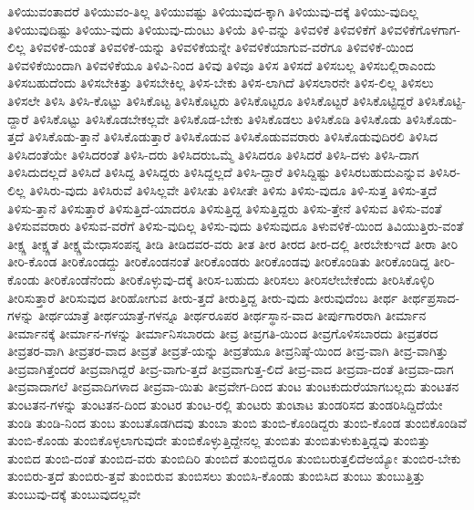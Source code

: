 {ತಿಳಿಯುವಂತಾದರೆ
ತಿಳಿಯುವಂ-ತಿಲ್ಲ
ತಿಳಿಯುವಷ್ಟು
ತಿಳಿಯುವುದ-ಕ್ಕಾಗಿ
ತಿಳಿಯುವು-ದಕ್ಕೆ
ತಿಳಿಯು-ವುದಿಲ್ಲ
ತಿಳಿಯುವುದಿಷ್ಟು
ತಿಳಿಯು-ವುದು
ತಿಳಿಯುವು-ದುಂಟು
ತಿಳಿಯೆ
ತಿಳಿ-ವನ್ನು
ತಿಳಿವಳಿಕೆ
ತಿಳಿವಳಿಕೆಗೆ
ತಿಳಿವಳಿಕೆಗೊಳಗಾಗ-ಲಿಲ್ಲ
ತಿಳಿವಳಿಕೆ-ಯಂತೆ
ತಿಳಿವಳಿಕೆ-ಯನ್ನು
ತಿಳಿವಳಿಕೆಯನ್ನೇ
ತಿಳಿವಳಿಕೆಯಾಗುವ-ವರೆಗೂ
ತಿಳಿವಳಿಕೆ-ಯಿಂದ
ತಿಳಿವಳಿಕೆಯಿಂದಾಗಿ
ತಿಳಿವಳಿಕೆಯೂ
ತಿಳಿವಿ-ನಿಂದ
ತಿಳಿವು
ತಿಳಿವೂ
ತಿಳಿಸ
ತಿಳಿಸದೆ
ತಿಳಿಸಬಲ್ಲ
ತಿಳಿಸಬಲ್ಲಿರಾಎಂದು
ತಿಳಿಸಬಹುದೆಂದು
ತಿಳಿಸಬೇಕಿತ್ತು
ತಿಳಿಸಬೇಕಿಲ್ಲ
ತಿಳಿಸ-ಬೇಕು
ತಿಳಿಸ-ಲಾಗಿದೆ
ತಿಳಿಸಲಾರನೇ
ತಿಳಿಸ-ಲಿಲ್ಲ
ತಿಳಿಸಲು
ತಿಳಿಸಲೇ
ತಿಳಿಸಿ
ತಿಳಿಸಿ-ಕೊಟ್ಟು
ತಿಳಿಸಿಕೊಟ್ಟ
ತಿಳಿಸಿಕೊಟ್ಟರು
ತಿಳಿಸಿಕೊಟ್ಟರೂ
ತಿಳಿಸಿಕೊಟ್ಟರೆ
ತಿಳಿಸಿಕೊಟ್ಟಿದ್ದರೆ
ತಿಳಿಸಿಕೊಟ್ಟಿ-ದ್ದಾರೆ
ತಿಳಿಸಿಕೊಟ್ಟು
ತಿಳಿಸಿಕೊಡಬೇಕಲ್ಲವೇ
ತಿಳಿಸಿಕೊಡ-ಬೇಕು
ತಿಳಿಸಿಕೊಡಲು
ತಿಳಿಸಿಕೊಡಿ
ತಿಳಿಸಿಕೊಡು
ತಿಳಿಸಿಕೊಡು-ತ್ತದೆ
ತಿಳಿಸಿಕೊಡು-ತ್ತಾನೆ
ತಿಳಿಸಿಕೊಡುತ್ತಾರೆ
ತಿಳಿಸಿಕೊಡುವ
ತಿಳಿಸಿಕೊಡುವವರಾರು
ತಿಳಿಸಿಕೊಡುವುದಿರಲಿ
ತಿಳಿಸಿದ
ತಿಳಿಸಿದಂತೆಯೇ
ತಿಳಿಸಿದರಂತೆ
ತಿಳಿಸಿ-ದರು
ತಿಳಿಸಿದರುಒಮ್ಮೆ
ತಿಳಿಸಿದರೂ
ತಿಳಿಸಿದರೆ
ತಿಳಿಸಿ-ದಳು
ತಿಳಿಸಿ-ದಾಗ
ತಿಳಿಸಿದುದಲ್ಲದೆ
ತಿಳಿಸಿದೆ
ತಿಳಿಸಿದ್ದ
ತಿಳಿಸಿದ್ದರು
ತಿಳಿಸಿದ್ದಲ್ಲದೆ
ತಿಳಿಸಿ-ದ್ದಾರೆ
ತಿಳಿಸಿದ್ದಿಷ್ಟು
ತಿಳಿಸಿರಬಹುದುಎನ್ನುವ
ತಿಳಿಸಿರ-ಲಿಲ್ಲ
ತಿಳಿಸಿರು-ವುದು
ತಿಳಿಸಿರುವೆ
ತಿಳಿಸಿಲ್ಲವೇ
ತಿಳಿಸೀತು
ತಿಳಿಸೀತೇ
ತಿಳಿಸು
ತಿಳಿಸು-ವುದೂ
ತಿಳಿ-ಸುತ್ತ
ತಿಳಿಸು-ತ್ತದೆ
ತಿಳಿಸು-ತ್ತಾನೆ
ತಿಳಿಸುತ್ತಾರೆ
ತಿಳಿಸುತ್ತಿದೆ-ಯಾದರೂ
ತಿಳಿಸುತ್ತಿದ್ದ
ತಿಳಿಸುತ್ತಿದ್ದರು
ತಿಳಿಸು-ತ್ತೇನೆ
ತಿಳಿಸುವ
ತಿಳಿಸು-ವಂತೆ
ತಿಳಿಸುವವರಾರು
ತಿಳಿಸುವ-ವರೆಗೆ
ತಿಳಿಸು-ವುದಿಲ್ಲ
ತಿಳಿಸು-ವುದು
ತಿಳಿಸುವುದೂ
ತಿಳುವಳಿಕೆ-ಯಿಂದ
ತಿವಿಯುತ್ತಿರು-ವಂತೆ
ತೀಕ್ಷ್ಣ
ತೀಕ್ಷ್ಣತೆ
ತೀಕ್ಷ್ಣಮೇಧಾಸಂಪನ್ನ
ತೀಡಿ
ತೀಡಿದವರ-ವರು
ತೀತ
ತೀರ
ತೀರದ
ತೀರ-ದಲ್ಲಿ
ತೀರಬೇಕುಇದೆ
ತೀರಾ
ತೀರಿ
ತೀರಿ-ಕೊಂಡ
ತೀರಿಕೊಂಡದ್ದು
ತೀರಿಕೊಂಡನಂತೆ
ತೀರಿಕೊಂಡರು
ತೀರಿಕೊಂಡವು
ತೀರಿಕೊಂಡಿತು
ತೀರಿಕೊಂಡಿದ್ದ
ತೀರಿ-ಕೊಂಡು
ತೀರಿಕೊಂಡೆನೆಂದು
ತೀರಿಕೊಳ್ಳುವು-ದಕ್ಕೆ
ತೀರಿಸ-ಬಹುದು
ತೀರಿಸಲು
ತೀರಿಸಲೇಬೇಕೆಂದು
ತೀರಿಸಿಕೊಳ್ಳಿರಿ
ತೀರಿಸುತ್ತಾರೆ
ತೀರಿಸುವುದ
ತೀರಿಹೋಗುವ
ತೀರು-ತ್ತದೆ
ತೀರುತ್ತಿದ್ದ
ತೀರು-ವುದು
ತೀರುವುದೆಂಬ
ತೀರ್ಥ
ತೀರ್ಥಪ್ರಸಾದ-ಗಳನ್ನು
ತೀರ್ಥಯಾತ್ರೆ
ತೀರ್ಥಯಾತ್ರೆ-ಗಳನ್ನೂ
ತೀರ್ಥರೂಪರ
ತೀರ್ಥಸ್ಥಾನ-ವಾದ
ತೀರ್ಪುಗಾರರಾಗಿ
ತೀರ್ಮಾನ
ತೀರ್ಮಾನಕ್ಕೆ
ತೀರ್ಮಾನ-ಗಳನ್ನು
ತೀರ್ಮಾನಿಸಬಾರದು
ತೀವ್ರ
ತೀವ್ರಗತಿ-ಯಿಂದ
ತೀವ್ರಗೊಳಿಸಬಾರದು
ತೀವ್ರತರದ
ತೀವ್ರತರ-ವಾಗಿ
ತೀವ್ರತರ-ವಾದ
ತೀವ್ರತೆ
ತೀವ್ರತೆ-ಯನ್ನು
ತೀವ್ರತೆಯೂ
ತೀವ್ರನಿಷ್ಠೆ-ಯಿಂದ
ತೀವ್ರ-ವಾಗಿ
ತೀವ್ರ-ವಾಗಿತ್ತು
ತೀವ್ರವಾಗಿತ್ತೆಂದರೆ
ತೀವ್ರವಾಗಿದ್ದರೆ
ತೀವ್ರ-ವಾಗು-ತ್ತದೆ
ತೀವ್ರವಾಗುತ್ತ-ಲಿದೆ
ತೀವ್ರ-ವಾದ
ತೀವ್ರವಾ-ದಂತೆ
ತೀವ್ರವಾ-ದಾಗ
ತೀವ್ರವಾದಾಗಲೆ
ತೀವ್ರವಾದಿಗಳಾದ
ತೀವ್ರವಾ-ಯಿತು
ತೀವ್ರವೇಗ-ದಿಂದ
ತುಂಟ
ತುಂಟಕುದುರೆಯಾಗಬಲ್ಲದು
ತುಂಟತನ
ತುಂಟತನ-ಗಳನ್ನು
ತುಂಟತನ-ದಿಂದ
ತುಂಟರ
ತುಂಟ-ರಲ್ಲಿ
ತುಂಟರು
ತುಂಟಾಟ
ತುಂಡರಿಸದ
ತುಂಡರಿಸಿದ್ದಿದೆಯೇ
ತುಂಡಿ
ತುಂಡಿ-ನಿಂದ
ತುಂಬ
ತುಂಬತೊಡಗಿದವು
ತುಂಬಾ
ತುಂಬಿ
ತುಂಬಿ-ಕೊಂಡಿದ್ದರು
ತುಂಬಿ-ಕೊಂಡ
ತುಂಬಿಕೊಂಡಿವೆ
ತುಂಬಿ-ಕೊಂಡು
ತುಂಬಿಕೊಳ್ಳಲಾಗುವುದೇ
ತುಂಬಿಕೊಳ್ಳುತ್ತಿದ್ದೇನಲ್ಲ
ತುಂಬಿತು
ತುಂಬಿತುಳುಕುತ್ತಿದ್ದವು
ತುಂಬಿತ್ತು
ತುಂಬಿದ
ತುಂಬಿ-ದಂತೆ
ತುಂಬಿದ-ವರು
ತುಂಬಿದಿರಿ
ತುಂಬಿದೆ
ತುಂಬಿದ್ದರೂ
ತುಂಬಿಬರುತ್ತಲಿದೆಅಯ್ಯೋ
ತುಂಬಿರ-ಬೇಕು
ತುಂಬಿರು-ತ್ತದೆ
ತುಂಬಿರು-ತ್ತವೆ
ತುಂಬಿರುವ
ತುಂಬಿಸಲು
ತುಂಬಿಸಿ-ಕೊಂಡು
ತುಂಬಿಸಿದ
ತುಂಬು
ತುಂಬುತ್ತಿತ್ತು
ತುಂಬುವು-ದಕ್ಕೆ
ತುಂಬುವುದಲ್ಲವೇ
}
